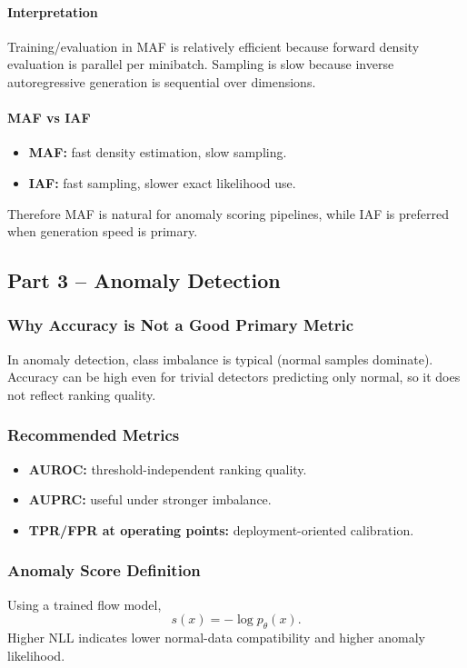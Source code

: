\documentclass[conference]{IEEEtran}
\begin{document}
\paragraph{Interpretation}
Training/evaluation in MAF is relatively efficient because forward density evaluation is parallel per minibatch. Sampling is slow because inverse autoregressive generation is sequential over dimensions.

\paragraph{MAF vs IAF}
\begin{itemize}
\item \textbf{MAF:} fast density estimation, slow sampling.
\item \textbf{IAF:} fast sampling, slower exact likelihood use.
\end{itemize}
Therefore MAF is natural for anomaly scoring pipelines, while IAF is preferred when generation speed is primary.

\subsection{Part 3 -- Anomaly Detection}

\subsubsection{Why Accuracy is Not a Good Primary Metric}
In anomaly detection, class imbalance is typical (normal samples dominate). Accuracy can be high even for trivial detectors predicting only normal, so it does not reflect ranking quality.

\subsubsection{Recommended Metrics}
\begin{itemize}
\item \textbf{AUROC:} threshold-independent ranking quality.
\item \textbf{AUPRC:} useful under stronger imbalance.
\item \textbf{TPR/FPR at operating points:} deployment-oriented calibration.
\end{itemize}

\subsubsection{Anomaly Score Definition}
Using a trained flow model,
\begin{equation}
 s(x)=-\log p_\theta(x).
\end{equation}
Higher NLL indicates lower normal-data compatibility and higher anomaly likelihood.
\end{document}
